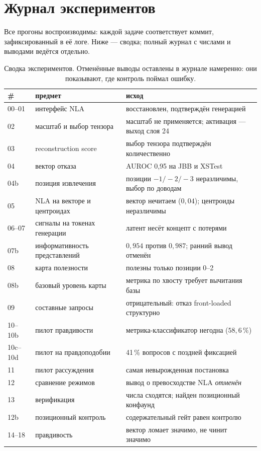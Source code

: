 \documentclass[11pt,a4paper]{article}
\begin{document}
\appendix
\section{Журнал экспериментов}

Все прогоны воспроизводимы: каждой задаче соответствует коммит, зафиксированный
в её логе. Ниже --- сводка; полный журнал с числами и выводами ведётся отдельно.

\begin{table}[htbp]
\centering
\small
\caption{Сводка экспериментов. Отменённые выводы оставлены в журнале намеренно:
они показывают, где контроль поймал ошибку.}
\begin{tabular}{llp{7.6cm}}
\toprule
\# & предмет & исход \\
\midrule
00--01 & интерфейс NLA & восстановлен, подтверждён генерацией \\
02 & масштаб и выбор тензора & масштаб не применяется; активация --- выход слоя 24 \\
03 & reconstruction score & выбор тензора подтверждён количественно \\
04 & вектор отказа & AUROC 0{,}95 на JBB и XSTest \\
04b & позиция извлечения & позиции $-1/-2/-3$ неразличимы, выбор по доводам \\
05 & NLA на векторе и центроидах & вектор нечитаем ($0{,}04$); центроиды неразличимы \\
06--07 & сигналы на токенах генерации & латент несёт концепт с потерями \\
07b & информативность представлений & $0{,}954$ против $0{,}987$; ранний вывод отменён \\
08 & карта полезности & полезны только позиции 0--2 \\
08b & базовый уровень карты & метрика по хвосту требует вычитания базы \\
09 & составные запросы & отрицательный: отказ front-loaded структурно \\
10--10b & пилот правдивости & метрика-классификатор негодна ($58{,}6\,\%$) \\
10c--10d & пилот на правдоподобии & 41\,\% вопросов с поздней фиксацией \\
11 & пилот рассуждения & самая невырожденная постановка \\
12 & сравнение режимов & вывод о превосходстве NLA \emph{отменён} \\
13 & верификация & числа сходятся; найден позиционный конфаунд \\
12b & позиционный контроль & содержательный гейт равен контролю \\
14--18 & правдивость & вектор ломает значимо, не чинит значимо \\
\bottomrule
\end{tabular}
\end{table}
\end{document}
